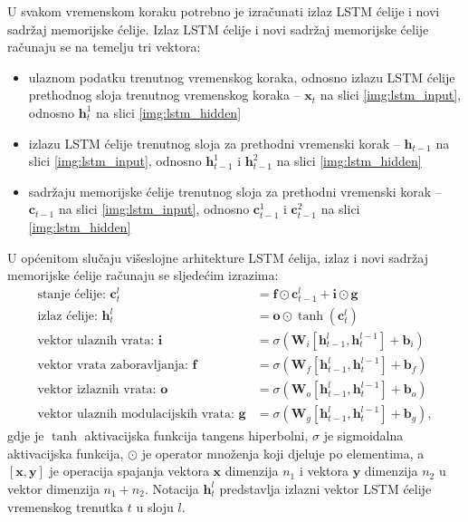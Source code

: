 \documentclass[times, utf8, diplomski, numeric]{fer}
\begin{document}
U svakom vremenskom koraku potrebno je izračunati izlaz LSTM ćelije i novi sadržaj memorijske ćelije.
Izlaz LSTM ćelije i novi sadržaj memorijske ćelije računaju se na temelju tri vektora:
\begin{itemize}
 \item ulaznom podatku trenutnog vremenskog koraka, odnosno izlazu LSTM ćelije prethodnog sloja trenutnog vremenskog koraka -- $\mathbf{x}_t$ na slici \ref{img:lstm_input}, odnosno $\mathbf{h}^{1}_t$ na slici \ref{img:lstm_hidden}
 \item izlazu LSTM ćelije trenutnog sloja za prethodni vremenski korak  -- $\mathbf{h}_{t-1}$  na slici \ref{img:lstm_input}, odnosno $\mathbf{h}_{t-1}^1$ i $\mathbf{h}_{t-1}^2$ na slici \ref{img:lstm_hidden}
 \item sadržaju memorijske ćelije trenutnog sloja za prethodni vremenski korak -- $\mathbf{c}_{t-1}$ na slici \ref{img:lstm_input}, odnosno $\mathbf{c}_{t-1}^1$ i $\mathbf{c}_{t-1}^2$ na slici \ref{img:lstm_hidden}
\end{itemize}
U općenitom slučaju višeslojne arhitekture LSTM ćelija, izlaz i novi sadržaj memorijske ćelije računaju se sljedećim izrazima:
\begin{align}
 \text{stanje ćelije: } \mathbf{c}_t^l &= \mathbf{f} \odot \mathbf{c}_{t-1}^l + \mathbf{i} \odot \mathbf{g} \\
 \text{izlaz ćelije: } \mathbf{h}_t^l &= \mathbf{o} \odot \tanh(\mathbf{c}^l_t) \\
 \text{vektor ulaznih vrata: } \mathbf{i} &= \sigma (\mathbf{W}_i [\mathbf{h}^{l}_{t-1}, \mathbf{h}^{l-1}_t] + \mathbf{b}_i) \\
 \text{vektor vrata zaboravljanja: } \mathbf{f} &= \sigma (\mathbf{W}_f [\mathbf{h}^{l}_{t-1}, \mathbf{h}^{l-1}_t] + \mathbf{b}_f) \\
 \text{vektor izlaznih vrata: } \mathbf{o} &= \sigma (\mathbf{W}_o [\mathbf{h}^{l}_{t-1}, \mathbf{h}^{l-1}_t] + \mathbf{b}_o) \\
 \text{vektor ulaznih modulacijskih vrata: } \mathbf{g} &= \sigma (\mathbf{W}_g [\mathbf{h}^{l}_{t-1}, \mathbf{h}^{l-1}_t] + \mathbf{b}_g), 
\end{align}
gdje je $\tanh$ aktivacijska funkcija tangens hiperbolni, $\sigma$ je sigmoidalna aktivacijska funkcija, $\odot$ je operator množenja koji djeluje po elementima, a $[\mathbf{x}, \mathbf{y}]$ je operacija spajanja vektora $\mathbf{x}$ dimenzija $n_1$ i vektora $\mathbf{y}$ dimenzija $n_2$ u vektor dimenzija $n_1 + n_2$.
Notacija $\mathbf{h}^{l}_{t}$ predstavlja izlazni vektor LSTM ćelije vremenskog trenutka $t$ u sloju $l$.
\end{document}
